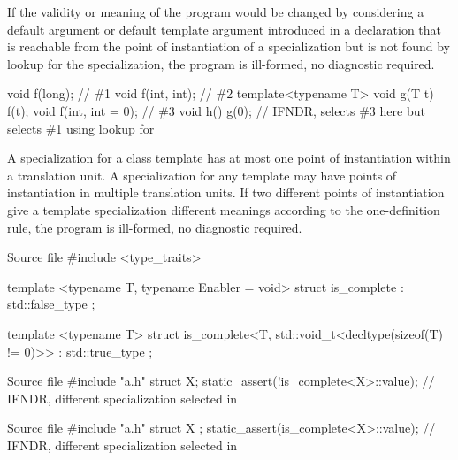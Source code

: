 
\pnum
If the validity or meaning of the program
would be changed by considering
a default argument or default template argument
introduced in a declaration that is reachable
from the point of instantiation of a specialization
but is not found by lookup for the specialization,
the program is ill-formed, no diagnostic required.

\pnum
\begin{example}
\begin{codeblock}
void f(long);           // \#1
void f(int, int);       // \#2
template<typename T> void g(T t) { f(t); }
void f(int, int = 0);   // \#3
void h() { g(0); }      // IFNDR, selects \#3 here but selects \#1 using lookup for 
\end{codeblock}
\end{example}


\pnum
A specialization for a class template has
at most one point of instantiation within a translation unit.
A specialization for any template
may have points of instantiation in multiple translation units.
If two different points of instantiation
give a template specialization
different meanings according to the one-definition rule,
the program is ill-formed, no diagnostic required.

\pnum
\begin{example}
\begin{codeblocktu}{Source file }
#include <type_traits>

template <typename T, typename Enabler = void>
struct is_complete : std::false_type {};

template <typename T>
struct is_complete<T, std::void_t<decltype(sizeof(T) != 0)>> : std::true_type {};
\end{codeblocktu}
\begin{codeblocktu}{Source file }
#include "a.h"
struct X;
static_assert(!is_complete<X>::value);  // IFNDR, different specialization selected in 
\end{codeblocktu}
\begin{codeblocktu}{Source file }
#include "a.h"
struct X { };
static_assert(is_complete<X>::value);   // IFNDR, different specialization selected in 
\end{codeblocktu}
\end{example}

